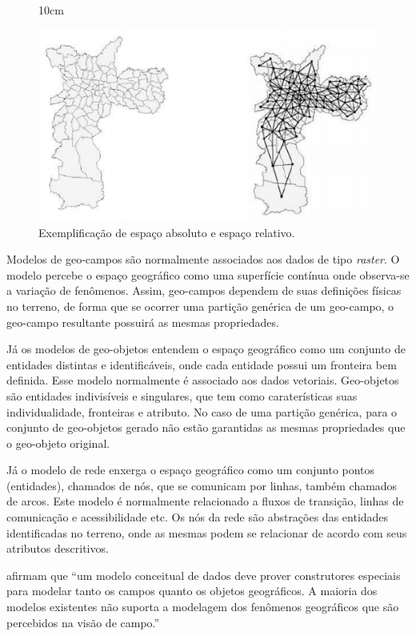 \begin{figure}[!ht]{10cm}
  \caption{Exemplificação de espaço absoluto e espaço relativo.} \label{sao_paulo}
  \includegraphics[width=0.75\hsize]{figuras/sao_paulo.png}
\end{figure}


Modelos de geo-campos são normalmente associados aos dados de tipo \textit{raster}. O modelo percebe o espaço geográfico como uma superfície contínua onde observa-se a variação de fenômenos. 
Assim, geo-campos dependem de suas definições físicas no terreno, de forma que se ocorrer uma partição genérica de um geo-campo, o geo-campo resultante possuirá as mesmas propriedades.

Já os modelos de geo-objetos entendem o espaço geográfico como um conjunto de entidades distintas e identificáveis, onde cada entidade possui um fronteira bem definida. Esse modelo normalmente é associado aos dados vetoriais.
Geo-objetos são entidades indivisíveis e singulares, que tem como caraterísticas suas individualidade, fronteiras e atributo. No caso de uma partição genérica, para o conjunto de geo-objetos gerado não estão garantidas as mesmas propriedades que o geo-objeto original.

Já o modelo de rede enxerga o espaço geográfico como um conjunto pontos (entidades), chamados de nós, que se comunicam por linhas, também chamados de arcos. Este modelo é normalmente relacionado a fluxos de transição, linhas de comunicação e acessibilidade etc. Os nós da rede são abstrações das entidades identificadas no terreno, onde as mesmas podem se relacionar de acordo com seus atributos descritivos.

 afirmam que ``um modelo conceitual de dados deve prover construtores especiais para modelar tanto os campos quanto os objetos geográficos. A maioria dos modelos existentes não
suporta a modelagem dos fenômenos geográficos que são percebidos na visão de campo.''

